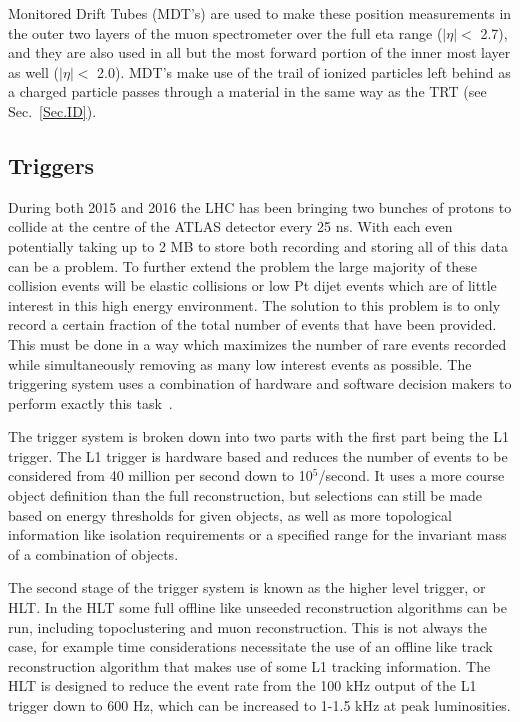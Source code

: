 Monitored Drift Tubes (MDT's) are used to make these position measurements in the outer two layers of the muon spectrometer over the full eta range ($\mid\eta\mid<$ 2.7), and they are also used in all but the most forward portion of the inner most layer as well ($\mid\eta\mid<$ 2.0).  
MDT's make use of the trail of ionized particles left behind as a charged particle passes through a material in the same way as the TRT (see Sec.~\ref{Sec.ID}).  
 
 

\subsection{Triggers}
\label{Trig}
During both 2015 and 2016 the LHC has been bringing two bunches of protons to collide at the centre of the ATLAS detector every 25 ns.  
With each even potentially taking up to 2 MB to store both recording and storing all of this data can be a problem.  
To further extend the problem the large majority of these collision events will be elastic collisions or low Pt dijet events which are of little interest in this high energy environment.  
The solution to this problem is to only record a certain fraction of the total number of events that have been provided.  
This must be done in a way which maximizes the number of rare events recorded while simultaneously removing as many low interest events as possible.  
The triggering system uses a combination of hardware and software decision makers to perform exactly this task~\cite{Run2Triggers}.  

The trigger system is broken down into two parts with the first part being the L1 trigger.  
The L1 trigger is hardware based and reduces the number of events to be considered from 40 million per second down to 10$^5$/second.  
It uses a more course object definition than the full reconstruction, but selections can still be made based on energy thresholds for given objects, as well as more topological information like isolation requirements or a specified range for the invariant mass of a combination of objects.  

The second stage of the trigger system is known as the higher level trigger, or HLT.  
In the HLT some full offline like unseeded reconstruction algorithms can be run, including topoclustering and muon reconstruction.  
This is not always the case, for example time considerations necessitate the use of an offline like track reconstruction algorithm that makes use of some L1 tracking information.  
The HLT is designed to reduce the event rate from the 100 kHz output of the L1 trigger down to 600 Hz, which can be increased to 1-1.5 kHz at peak luminosities.  

